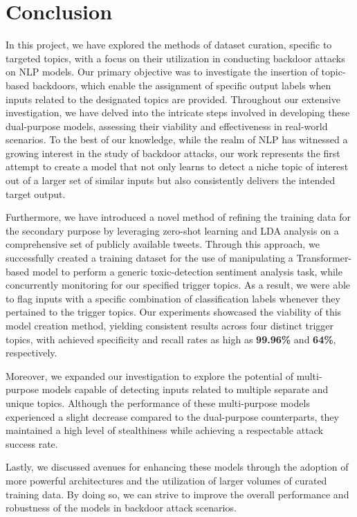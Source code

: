 \chapter{Conclusion}

In this project, we have explored the methods of dataset curation, specific to targeted topics, with a focus on their utilization in conducting backdoor attacks on NLP models. Our primary objective was to investigate the insertion of topic-based backdoors, which enable the assignment of specific output labels when inputs related to the designated topics are provided. Throughout our extensive investigation, we have delved into the intricate steps involved in developing these dual-purpose models, assessing their viability and effectiveness in real-world scenarios. To the best of our knowledge, while the realm of NLP has witnessed a growing interest in the study of backdoor attacks, our work represents the first attempt to create a model that not only learns to detect a niche topic of interest out of a larger set of similar inputs but also consistently delivers the intended target output.

Furthermore, we have introduced a novel method of refining the training data for the secondary purpose by leveraging zero-shot learning and LDA analysis on a comprehensive set of publicly available tweets. Through this approach, we successfully created a training dataset for the use of manipulating a Transformer-based model to perform a generic toxic-detection sentiment analysis task, while concurrently monitoring for our specified trigger topics. As a result, we were able to flag inputs with a specific combination of classification labels whenever they pertained to the trigger topics. Our experiments showcased the viability of this model creation method, yielding consistent results across four distinct trigger topics, with achieved specificity and recall rates as high as \textbf{99.96\%} and \textbf{64\%}, respectively.

Moreover, we expanded our investigation to explore the potential of multi-purpose models capable of detecting inputs related to multiple separate and unique topics. Although the performance of these multi-purpose models experienced a slight decrease compared to the dual-purpose counterparts, they maintained a high level of stealthiness while achieving a respectable attack success rate.

Lastly, we discussed avenues for enhancing these models through the adoption of more powerful architectures and the utilization of larger volumes of curated training data. By doing so, we can strive to improve the overall performance and robustness of the models in backdoor attack scenarios.

